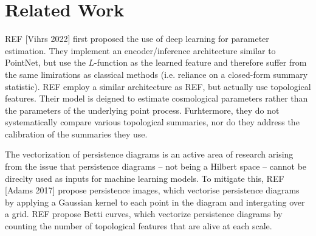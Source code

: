 \documentclass[11pt,letterpaper]{article}
\newcommand{\1}{\mathds{1}}
\theoremstyle{plain}
\theoremstyle{definitioncolon}
\begin{document}

\section{Related Work}
\label{sec:related}

REF [Vihrs 2022] first proposed the use of deep learning for parameter estimation. They implement
an encoder/inference architecture similar to PointNet, but use the $L$-function as the learned
feature and therefore suffer from the same limirations as classical methods (i.e. reliance
on a closed-form summary statistic). REF employ a similar architecture as REF, but actually use
topological features. Their model is deigned to estimate cosmological parameters rather than the
parameters of the underlying point process. Furhtermore, they do not systematically compare
various topological summaries, nor do they address the calibration of the summaries they use.

The vectorization of persistence diagrams is an active area of research arising from the issue
that persistence diagrams -- not being a Hilbert space -- cannot be direclty used as inputs for
machine learning models. To mitigate this, REF [Adams 2017] propose persistence images, which vectorise persistence
diagrams by applying a Gaussian kernel to each point in the diagram and intergating over a grid.
REF propose Betti curves, which vectorize persistence diagrams by counting the number of topological features
that are alive at each scale.


\end{document}
